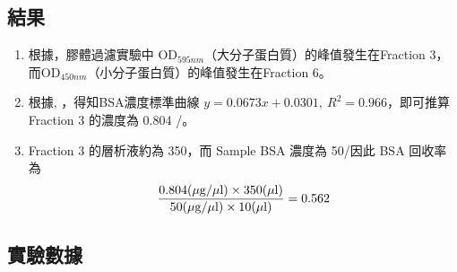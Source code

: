\subsection*{結果}
\begin{enumerate}
  \item 根據，膠體過濾實驗中 OD$_{595nm}$（大分子蛋白質）的峰值發生在Fraction 3，而OD$_{450nm}$（小分子蛋白質）的峰值發生在Fraction 6。
  \item 根據,  ，得知BSA濃度標準曲線 $y=0.0673x+0.0301,\ R^2=0.966$，即可推算 Fraction 3 的濃度為 0.804 \mug/\mul。 
  \item Fraction 3 的層析液約為 350\mul，而 Sample BSA 濃度為 50\mug/\mul 因此 BSA 回收率為
  $$
  \frac{0.804(\mug/\mul)\times 350(\mul)}{50(\mug/\mul)\times 10(\mul)}=0.562
  $$



\end{enumerate}


  




\subsection*{實驗數據}

